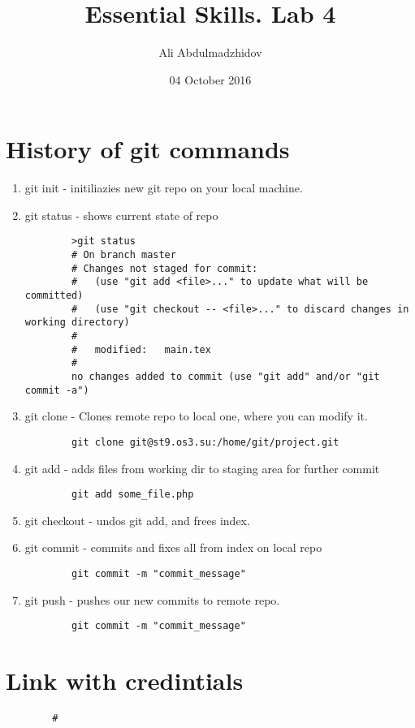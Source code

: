 \documentclass[10pt]{article}
\title{Essential Skills. Lab 4}
\date{04 October 2016}
\author{Ali Abdulmadzhidov}
\begin{document}
\renewcommand*\rmdefault{cmss}
\maketitle
\section{History of git commands}
\begin{enumerate}
    \item git init - initiliazies new git repo on your local machine.
    \item git status - shows current state of repo
    \begin{verbatim}
        >git status
        # On branch master
        # Changes not staged for commit:
        #   (use "git add <file>..." to update what will be committed)
        #   (use "git checkout -- <file>..." to discard changes in working directory)
        #
        #   modified:   main.tex
        #
        no changes added to commit (use "git add" and/or "git commit -a")
    \end{verbatim}
    \item git clone - Clones remote repo to local one, where you can modify it.
    \begin{verbatim}
        git clone git@st9.os3.su:/home/git/project.git
    \end{verbatim}
    \item git add - adds files from working dir to staging area for further commit
    \begin{verbatim}
        git add some_file.php
    \end{verbatim}
    \item git checkout - undos git add, and frees index.
    \item git commit - commits and fixes all from index on local repo
    \begin{verbatim}
        git commit -m "commit_message"
    \end{verbatim}
    \item git push - pushes our new commits to remote repo.
    \begin{verbatim}
        git commit -m "commit_message"
    \end{verbatim}
\end{enumerate}

\section{Link with credintials}
    \begin{verbatim}
        #
    \end{verbatim}
\end{document}
